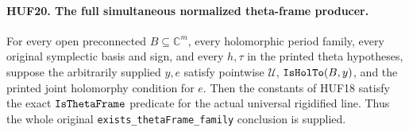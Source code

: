\documentclass[11pt,a4paper]{article}
\numberwithin{equation}{section}
\theoremstyle{remark}\newtheorem{remark}[theorem]{Remark}
\begin{document}
\paragraph{HUF20. The full simultaneous normalized theta-frame producer.}
\label{claim:HUF20}
For every open preconnected \(B\subseteq\mathbb C^m\),
every holomorphic period family, every original
symplectic basis and sign, and every \(h,\tau\)
in the printed theta hypotheses, suppose the
arbitrarily supplied \(y,e\) satisfy pointwise
\(\mathcal U\), \(\texttt{Is\allowbreak Hol\allowbreak To}(B,y)\), and
the printed joint holomorphy condition for \(e\).
Then the constants
of HUF18 satisfy the exact
\(\texttt{Is\allowbreak Theta\allowbreak Frame}\) predicate for the
actual universal rigidified line.
Thus the whole original
\texttt{exists\_\allowbreak theta\allowbreak Frame\_\allowbreak family} conclusion
is supplied.
\end{document}
